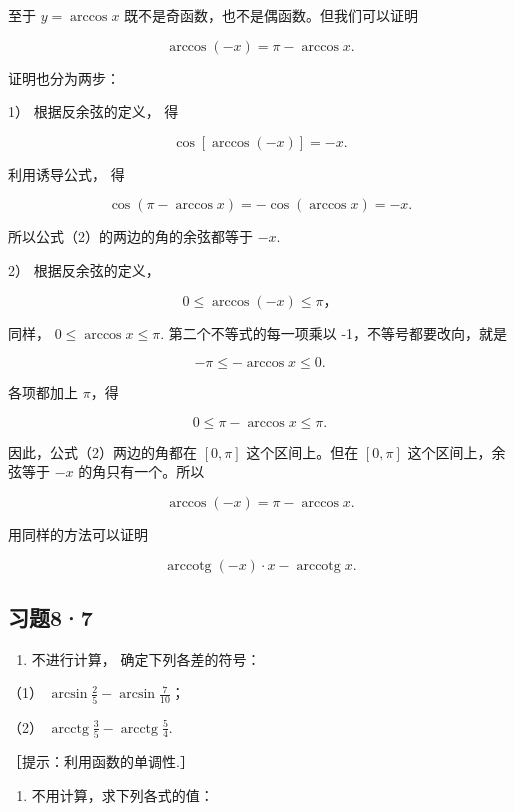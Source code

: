 至于 \(y = \arccos x\) 既不是奇函数，也不是偶函数。但我们可以证明

\[
\boxed {\operatorname{arccos} (- x) = \pi - \operatorname{arccos} x.} \tag {2}
\]

证明也分为两步：

1） 根据反余弦的定义， 得

\[
\cos [ \arccos (- x) ] = - x.
\]

利用诱导公式， 得

\[
\cos (\pi - \arccos x) = - \cos (\arccos x) = - x.
\]

所以公式（2）的两边的角的余弦都等于 \(-x\).

2） 根据反余弦的定义，

\[
0 \leqslant \arccos (- x) \leqslant \pi \text{，}
\]

同样， \(0\leqslant \arccos x\leqslant \pi .\) 第二个不等式的每一项乘以
-1，不等号都要改向，就是

\[
- \pi \leqslant - \arccos x \leqslant 0.
\]

各项都加上 \(\pi\)，得

\[
0 \leqslant \pi - \arccos x \leqslant \pi .
\]

因此，公式（2）两边的角都在 \([0, \pi]\) 这个区间上。但在 \([0, \pi]\)
这个区间上，余弦等于 \(-x\) 的角只有一个。所以

\[
\arccos(-x)=\pi-\arccos x.
\]

用同样的方法可以证明

\[
\boxed {\operatorname{arccotg} (- x) \cdot x - \operatorname{arccotg} x.}
\]

\subsection{习题8·7}

\begin{enumerate}
\item
  不进行计算， 确定下列各差的符号：
\end{enumerate}

（1） \(\arcsin \frac{2}{5} - \arcsin \frac{7}{10}\)；

（2）
\(\operatorname{arcctg} \frac{3}{5} - \operatorname{arcctg} \frac{5}{4}\).

［提示：利用函数的单调性.］

\begin{enumerate}[start=2]
\item
  不用计算，求下列各式的值：
\end{enumerate}

